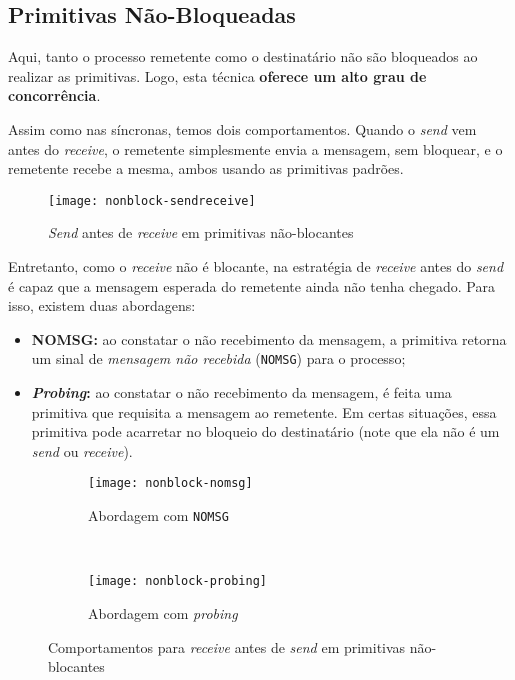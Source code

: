 \subsection{Primitivas Não-Bloqueadas}
Aqui, tanto o processo remetente como o destinatário não são bloqueados ao realizar as primitivas. Logo, esta técnica \textbf{oferece um alto grau de concorrência}.

Assim como nas síncronas, temos dois comportamentos. Quando o \textit{send} vem antes do \textit{receive}, o remetente simplesmente envia a mensagem, sem bloquear, e o remetente recebe a mesma, ambos usando as primitivas padrões.

\begin{figure}[ht]
  \centering
  \texttt{[image: nonblock-sendreceive]}
  \caption{\textit{Send} antes de \textit{receive} em primitivas não-blocantes}
  \label{fig:nonblock-sendreceive}
\end{figure}

Entretanto, como o \textit{receive} não é blocante, na estratégia de \textit{receive} antes do \textit{send} é capaz que a mensagem esperada do remetente ainda não tenha chegado. Para isso, existem duas abordagens:

\begin{itemize}
  \item \textbf{NOMSG:} ao constatar o não recebimento da mensagem, a primitiva retorna um sinal de \textit{mensagem não recebida} (\texttt{NOMSG}) para o processo;

  \item \textbf{\textit{Probing}:} ao constatar o não recebimento da mensagem, é feita uma primitiva que requisita a mensagem ao remetente. Em certas situações, essa primitiva pode acarretar no bloqueio do destinatário (note que ela não é um \textit{send} ou \textit{receive}).
\end{itemize}

\begin{figure*}[ht]
  \begin{subfigure}{0.5\textwidth}
    \centering
    \texttt{[image: nonblock-nomsg]}
    \caption{Abordagem com \texttt{NOMSG}}
    \label{subfig:nonblock-nomsg}
  \end{subfigure}
  ~
  \begin{subfigure}{0.5\textwidth}
    \centering
    \texttt{[image: nonblock-probing]}
    \caption{Abordagem com \textit{probing}}
    \label{subfig:nonblock-probing}
  \end{subfigure}

  \caption{Comportamentos para \textit{receive} antes de \textit{send} em primitivas não-blocantes}
  \label{fig:messages-nonblock}
\end{figure*}
